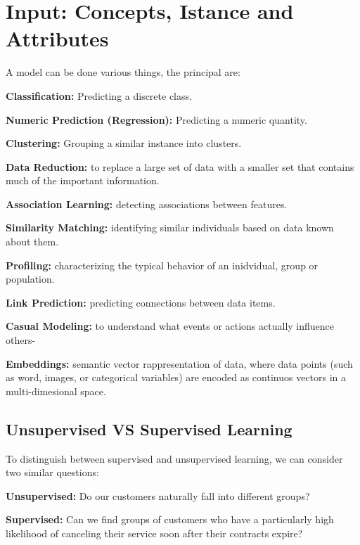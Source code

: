 \section{Input: Concepts, Istance and Attributes}

    A model can be done various things, the principal are:
    \begin{compactitemize}
        \item \textbf{Classification:} Predicting a discrete class.
        \item \textbf{Numeric Prediction (Regression):} Predicting a numeric quantity.
        \item \textbf{Clustering:} Grouping a similar instance into clusters.
        \item \textbf{Data Reduction:} to replace a large set of data with a smaller set that contains much of the important information.
        \item \textbf{Association Learning:} detecting associations between features.
        \item \textbf{Similarity Matching:} identifying similar individuals based on data known about them.
        \item \textbf{Profiling:} characterizing the typical behavior of an inidvidual, group or population.
        \item \textbf{Link Prediction:} predicting connections between data items.
        \item \textbf{Casual Modeling:} to understand what events or actions actually influence others-
        \item \textbf{Embeddings:} semantic vector rappresentation of data, where data points (such as word, images, or categorical variables) are encoded as continuos vectors in a multi-dimesional space.
    \end{compactitemize}


\subsection{Unsupervised VS Supervised Learning}

    To distinguish between supervised and unsupervised learning, we can consider two similar questions:
    \begin{compactitemize}
        \item \textbf{Unsupervised:} Do our customers naturally fall into different groups?
        \item \textbf{Supervised:} Can we find groups of customers who have a particularly high likelihood of canceling their service soon after their contracts expire?
    \end{compactitemize}
    
